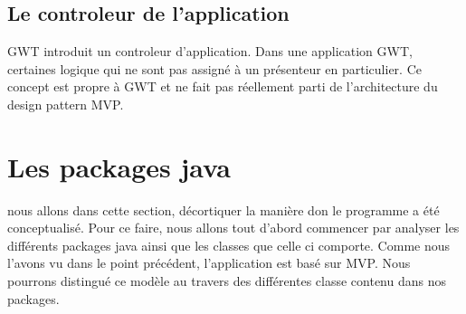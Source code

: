 \subsection{Le controleur de l'application} 
GWT introduit un controleur d'application. Dans une application GWT, certaines logique qui ne sont pas assigné à un présenteur en particulier. Ce concept est propre à GWT et ne fait pas réellement parti de l'architecture du design pattern MVP. 
 
\section{Les packages java}
nous allons dans cette section, décortiquer la manière don le programme a été conceptualisé. Pour ce faire, nous allons tout d'abord commencer par analyser les différents packages java ainsi que les classes que celle ci comporte. Comme nous l'avons vu dans le point précédent, l'application est basé sur MVP. Nous pourrons distingué ce modèle au travers des différentes classe contenu dans nos packages.

